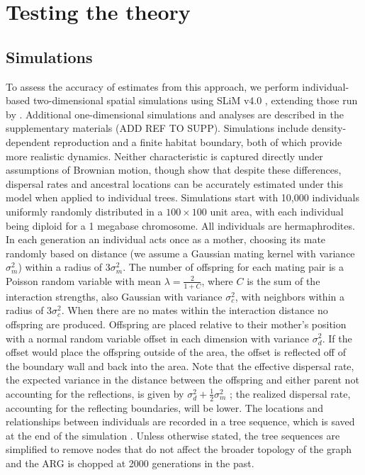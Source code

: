 \section{Testing the theory}

\subsection{Simulations}

To assess the accuracy of estimates from this approach, we perform individual-based two-dimensional spatial simulations using SLiM v4.0 \citep{haller2023slim}, extending those run by \citet{osmond2024estimating}. Additional one-dimensional simulations and analyses are described in the supplementary materials (ADD REF TO SUPP). Simulations include density-dependent reproduction and a finite habitat boundary, both of which provide more realistic dynamics. Neither characteristic is captured directly under assumptions of Brownian motion, though \citet{osmond2024estimating} show that despite these differences, dispersal rates and ancestral locations can be accurately estimated under this model when applied to individual trees. Simulations start with 10,000 individuals uniformly randomly distributed in a $100 \times 100$ unit area, with each individual being diploid for a 1 megabase chromosome.  All individuals are hermaphrodites. In each generation an individual acts once as a mother, choosing its mate randomly based on distance (we assume a Gaussian mating kernel with variance $\sigma^2_m$) within a radius of $3\sigma^2_m$. The number of offspring for each mating pair is a Poisson random variable with mean $\lambda=\frac{2}{1 + C}$, where $C$ is the sum of the interaction strengths, also Gaussian with variance $\sigma^2_c$, with neighbors within a radius of $3\sigma^2_c$. When there are no mates within the interaction distance no offspring are produced. Offspring are placed relative to their mother's position with a normal random variable offset in each dimension with variance $\sigma^2_d$. If the offset would place the offspring outside of the area, the offset is reflected off of the boundary wall and back into the area. Note that the effective dispersal rate, the expected variance in the distance between the offspring and either parent not accounting for the reflections, is given by $\sigma^2_d + \frac{1}{2} \sigma^2_m$ \citep{smith2023dispersal}; the realized dispersal rate, accounting for the reflecting boundaries, will be lower. The locations and relationships between individuals are recorded in a tree sequence, which is saved at the end of the simulation \citep{haller2019tree}. Unless otherwise stated, the tree sequences are simplified to remove nodes that do not affect the broader topology of the graph and the ARG is chopped at 2000 generations in the past.


